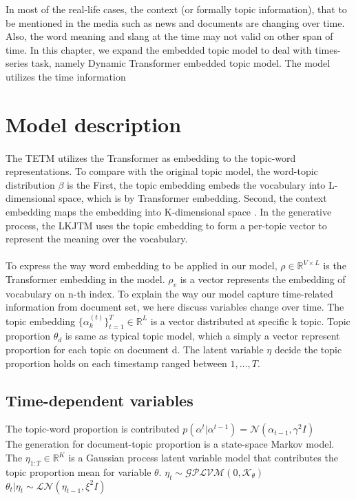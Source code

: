 In most of the real-life cases, the context (or formally topic information), that to be mentioned in the media such as news and documents are changing over time. Also, the word meaning and slang at the time may not valid on other span of time.
In this chapter, we expand the embedded topic model to deal with times-series task, namely Dynamic Transformer embedded topic model. The model utilizes the time information 
\section{Model description}
\paragraph{}The TETM utilizes the Transformer as embedding to the topic-word representations. To compare with the original topic model, the word-topic distribution $ \beta $ is the 
First, the topic embedding embeds the vocabulary into L-dimensional space, which is by Transformer embedding. Second, the context embedding maps the embedding into K-dimensional space . 
In the generative process, the LKJTM uses the topic embedding to form a per-topic vector to represent the meaning over the vocabulary. 
\paragraph{}
To express the way word embedding to be applied in our model, $ \rho\in\mathbb{R}^{V\times L} $ is the Transformer embedding in the model. $ \rho_v $ is a vector represents the embedding of vocabulary on n-th index.
To explain the way our model capture time-related information from document set, we here discuss variables change over time. The topic embedding $ \{\alpha^{(t)}_k\}^{T}_{t=1}\in\mathbb{R}^{L} $ is a vector distributed at specific k topic.
Topic proportion $ \theta_d $ is same as typical topic model, which a simply a vector represent proportion for each topic on document d.
The latent variable $ \eta $ decide the topic proportion holds on each timestamp ranged between $ 1, \dots, T $. 
\subsection{Time-dependent variables}
The topic-word proportion is contributed 
$ p(\alpha^{t}|\alpha^{t-1})=\mathcal{N}(\alpha_{t-1},\gamma^2I) $\\
The generation for document-topic proportion is a state-space Markov model. The $ \eta_{1:T}\in\mathbb{R}^{K} $ is a Gaussian process latent variable model that contributes the topic proportion mean for variable $ \theta $. $ \eta_t\sim\mathcal{GPLVM}(0,\mathcal{K}_{\theta}) $ 
$ \theta_t|\eta_t\sim\mathcal{LN}(\eta_{t-1},\xi^2I) $ 
